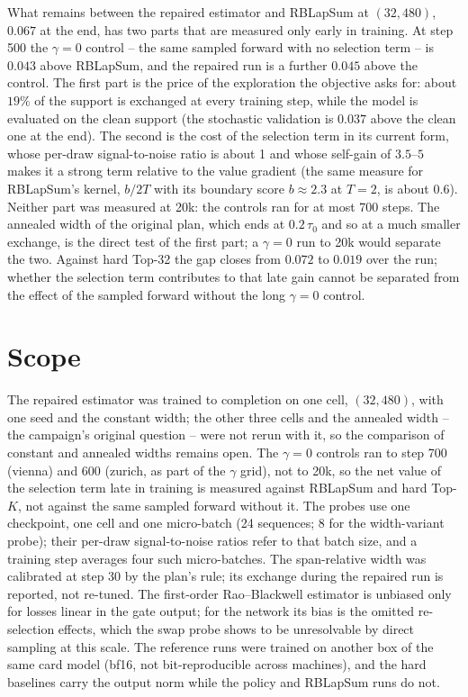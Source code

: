 \documentclass[11pt,a4paper]{article}
\begin{document}
What remains between the repaired estimator and RBLapSum at $(32, 480)$,
$0.067$ at the end, has two parts that are measured only early in training. At
step 500 the $\gamma = 0$ control -- the same sampled forward with no selection
term -- is $0.043$ above RBLapSum, and the repaired run is a further $0.045$ above
the control. The first part is the price of the exploration the objective asks
for: about $19\%$ of the support is exchanged at every training step, while the
model is evaluated on the clean support (the stochastic validation is $0.037$
above the clean one at the end). The second is the cost of the selection term in
its current form, whose per-draw signal-to-noise ratio is about 1 and whose
self-gain of $3.5$--$5$ makes it a strong term relative to the value gradient
(the same measure for RBLapSum's kernel, $b/2T$ with its boundary score
$b \approx 2.3$ at $T = 2$, is about $0.6$). Neither part was
measured at 20k: the controls ran for at most 700 steps. The annealed width of the
original plan, which ends at $0.2\,\tau_0$ and so at a much smaller exchange, is
the direct test of the first part; a $\gamma = 0$ run to 20k would separate the
two. Against hard Top-32 the gap closes from $0.072$ to $0.019$ over the run;
whether the selection term contributes to that late gain cannot be separated
from the effect of the sampled forward without the long $\gamma = 0$ control.

\section{Scope}

The repaired estimator was trained to completion on one cell, $(32, 480)$, with
one seed and the constant width; the other three cells and the annealed width --
the campaign's original question -- were not rerun with it, so the comparison of
constant and annealed widths remains open. The $\gamma = 0$ controls ran to step
700 (vienna) and 600 (zurich, as part of the $\gamma$ grid), not to 20k, so the
net value of the selection term late in training is measured against RBLapSum
and hard Top-$K$, not against the same sampled forward without it. The probes use
one checkpoint, one cell and one micro-batch (24 sequences; 8 for the
width-variant probe); their per-draw signal-to-noise ratios refer to that batch
size, and a training step averages four such micro-batches. The span-relative
width was calibrated at step 30 by the plan's rule; its exchange during the
repaired run is reported, not re-tuned. The first-order Rao--Blackwell estimator
is unbiased only for losses linear in the gate output; for the network its bias
is the omitted re-selection effects, which the swap probe shows to be
unresolvable by direct sampling at this scale. The reference runs were trained
on another box of the same card model (bf16, not bit-reproducible across
machines), and the hard baselines carry the output norm while the policy and
RBLapSum runs do not.
\end{document}
